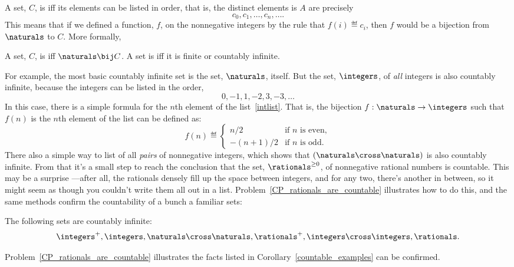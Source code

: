 A set, $C$, is  iff its elements can be listed in order,
that is, the distinct elements is $A$ are precisely
\[
c_0, c_1, \dots, c_n, \dots.
\]
This means that if we defined a function, $f$, on the nonnegative integers
by the rule that $f(i) \eqdef c_i$, then $f$ would be a bijection from
$\naturals$ to $C$.  More formally,

\begin{definition}
  A set, $C$, is  iff $\naturals \bij C$.  A set
  is  iff it is finite or countably infinite.
\end{definition}

For example, the most basic countably infinite set is the set,
$\naturals$, itself.  But the set, $\integers$, of \emph{all} integers is
also countably infinite, because the integers can be listed in the order,
\begin{equation}\label{intlist}
0,-1,1,-2,3,-3,\dots
\end{equation}
In this case, there is a simple formula for the $n$th element of the
list~\eqref{intlist}.  That is, the bijection $f:\naturals \to
\integers$ such that $f(n)$ is the $n$th element of the list can be defined as:
\[
f(n) \eqdef \begin{cases}
            n/2 & \text{if $n$ is even},\\
            -(n+1)/2 & \text{if $n$ is odd}.
           \end{cases} 
\]    
There also a simple way to list of all \emph{pairs} of nonnegative
integers, which shows that $(\naturals \cross \naturals)$ is also
countably infinite.  From that it's a small step to reach the
conclusion that the set, $\rationals^{\ge 0}$, of nonnegative rational
numbers is countable.  This may be a surprise ---after all, the
rationals densely fill up the space between integers, and for any two,
there's another in between, so it might seem as though you couldn't
write them all out in a list.
Problem~\ref{CP_rationals_are_countable} illustrates how to do this,
and the same methods confirm the countability of a bunch a familiar
sets:

\begin{corollary}\label{countable_examples}
The following sets are countably infinite:
\[\integers^+, 
 \integers,
 \naturals \cross \naturals,
 \rationals^+,
 \integers \cross \integers,
 \rationals.
\]
\end{corollary}
Problem~\ref{CP_rationals_are_countable} illustrates the facts listed in
Corollary~\ref{countable_examples} can be confirmed.

